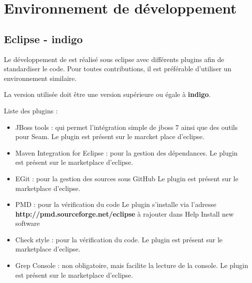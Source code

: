 \newpage{}
\chapter{Environnement de développement}

\section{Eclipse - indigo}
Le développement de \youTestIt{} est réalisé sous eclipse avec différents plugins afin de standardiser 
le code. Pour toutes contributions, il est préférable  d'utiliser un environnement similaire.

La version utilisée doit être une version supérieure ou égale à \textbf{indigo}. 

Liste des plugins :
\begin{itemize}
	\item JBoss tools : qui permet l'intégration simple de jboss 7 ainsi que des outils pour Seam.
				Le plugin est présent sur le marcket place d'eclipse.
				
	\item Maven Integration for Eclipse : pour la gestion des dépendances.
					Le plugin est présent sur le marketplace d'eclipse.
					
	\item EGit : pour la gestion des sources sous GitHub
					Le plugin est présent sur le marketplace d'eclipse.
					
	\item PMD : pour la vérification du code
					Le plugin s'installe via l'adresse \textbf{http://pmd.sourceforge.net/eclipse } à rajouter dans 
					Help \rightArrow{} Install new software
					
	\item Check style : pour la vérification du code.
					Le plugin est présent sur le marketplace d'eclipse.
					
	\item Grep Console : non obligatoire, mais facilite la lecture de la console.
					Le plugin est présent sur le marketplace d'eclipse.
\end{itemize}

